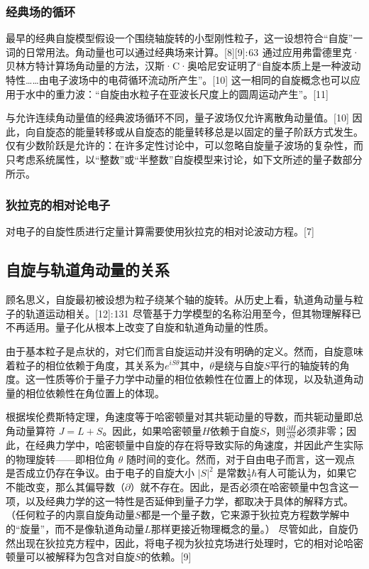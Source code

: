 \subsubsection{经典场的循环}
最早的经典自旋模型假设一个围绕轴旋转的小型刚性粒子，这一设想符合“自旋”一词的日常用法。角动量也可以通过经典场来计算。[8][9]: 63  通过应用弗雷德里克·贝林方特计算场角动量的方法，汉斯·C·奥哈尼安证明了“自旋本质上是一种波动特性……由电子波场中的电荷循环流动所产生”。[10] 这一相同的自旋概念也可以应用于水中的重力波：“自旋由水粒子在亚波长尺度上的圆周运动产生”。[11]

与允许连续角动量值的经典波场循环不同，量子波场仅允许离散角动量值。[10] 因此，向自旋态的能量转移或从自旋态的能量转移总是以固定的量子阶跃方式发生。仅有少数阶跃是允许的：在许多定性讨论中，可以忽略自旋量子波场的复杂性，而只考虑系统属性，以“整数”或“半整数”自旋模型来讨论，如下文所述的量子数部分所示。
\subsubsection{狄拉克的相对论电子}
对电子的自旋性质进行定量计算需要使用狄拉克的相对论波动方程。[7]
\subsection{自旋与轨道角动量的关系 } 
顾名思义，自旋最初被设想为粒子绕某个轴的旋转。从历史上看，轨道角动量与粒子的轨道运动相关。[12]: 131  尽管基于力学模型的名称沿用至今，但其物理解释已不再适用。量子化从根本上改变了自旋和轨道角动量的性质。  

由于基本粒子是点状的，对它们而言自旋运动并没有明确的定义。然而，自旋意味着粒子的相位依赖于角度，其关系为\(e^{iS\theta}\)其中，\(\theta\)是绕与自旋\(S\)平行的轴旋转的角度。这一性质等价于量子力学中动量的相位依赖性在位置上的体现，以及轨道角动量的相位依赖性在角位置上的体现。

根据埃伦费斯特定理，角速度等于哈密顿量对其共轭动量的导数，而共轭动量即总角动量算符 \( J = L + S \)。因此，如果哈密顿量\( H \)依赖于自旋\( S \)，则\(\frac{\partial H}{\partial S}\)必须非零；因此，在经典力学中，哈密顿量中自旋的存在将导致实际的角速度，并因此产生实际的物理旋转——即相位角 \( \theta \) 随时间的变化。然而，对于自由电子而言，这一观点是否成立仍存在争议。由于电子的自旋大小 \( |S|^2 \) 是常数\(\frac{1}{2} \hbar\)有人可能认为，如果它不能改变，那么其偏导数（\(\partial \)）就不存在。因此，是否必须在哈密顿量中包含这一项，以及经典力学的这一特性是否延伸到量子力学，都取决于具体的解释方式。（任何粒子的内禀自旋角动量\( S \)都是一个量子数，它来源于狄拉克方程数学解中的“旋量”，而不是像轨道角动量\( L \)那样更接近物理概念的量。） 尽管如此，自旋仍然出现在狄拉克方程中，因此，将电子视为狄拉克场进行处理时，它的相对论哈密顿量可以被解释为包含对自旋\( S \)的依赖。[9]
